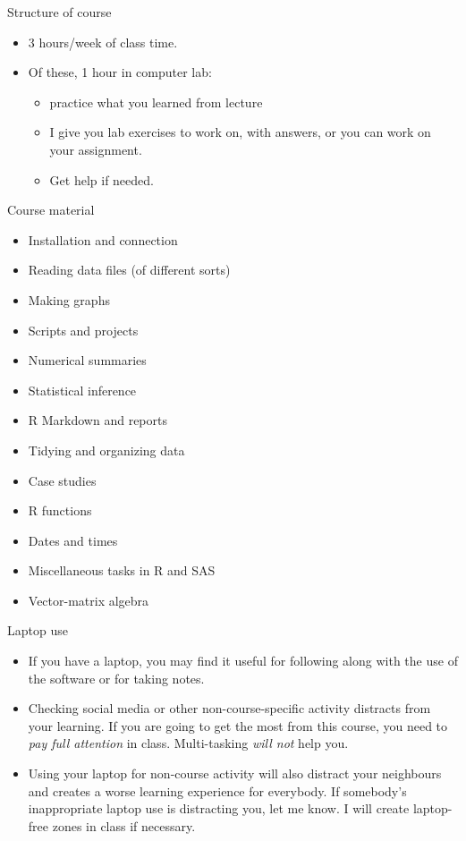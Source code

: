 \documentclass[unknownkeysallowed]{beamer}\usepackage[]{graphicx}\usepackage[]{color}
\begin{document}
\begin{frame}{Structure of course}

  \begin{itemize}
  \item 3 hours/week of class time.
  \item Of these, 1 hour in computer lab:
    \begin{itemize}
    \item practice what you learned from lecture
    \item I give you lab exercises to work on, with answers, or you
      can work on your assignment.
    \item Get help if needed.
    \end{itemize}
  \end{itemize}
  
\end{frame}

\begin{frame}{Course material}
  
\begin{itemize}
\item Installation and connection
\item Reading data files (of different sorts)
\item Making graphs
\item Scripts and projects
\item Numerical summaries
\item Statistical inference
\item R Markdown and reports
\item Tidying and organizing data
\item Case studies
\item R functions
\item Dates and times
\item Miscellaneous tasks in R and SAS
\item Vector-matrix algebra
\end{itemize}

  
\end{frame}

\begin{frame}[fragile]{Laptop use}
  
  \begin{itemize}
  \item If you have a laptop, you may find it useful for following
    along with the use of the software or for taking notes.
  \item Checking social media or other non-course-specific activity
    distracts from your learning. If you are going to get the most
    from this course, you need to \emph{pay full attention} in
    class. Multi-tasking \emph{will not} help you.
  \item Using your laptop for non-course activity will also distract
    your neighbours and creates a worse learning experience for
    everybody. If somebody's inappropriate laptop use is distracting
    you, let me know. I will create laptop-free zones in class if
    necessary. 
  \end{itemize}
  
\end{frame}
\end{document}
